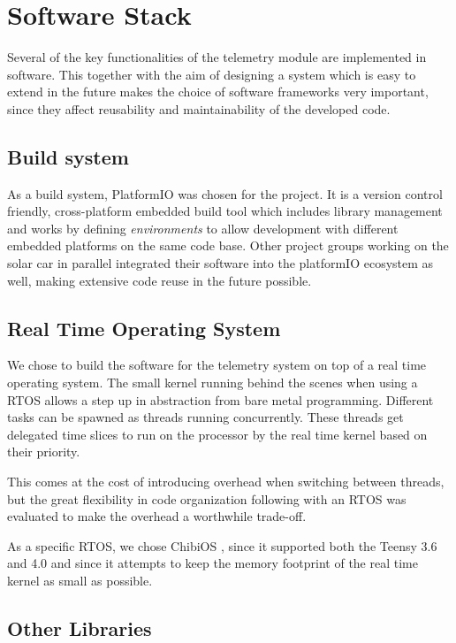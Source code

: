 \documentclass[conference]{IEEEtran}
\begin{document}
\section{Software Stack}

Several of the key functionalities of the telemetry module are implemented in software. This together with the aim of designing a system which is easy to extend in the future makes the choice of software frameworks very important, since they affect reusability and maintainability of the developed code.

\subsection{Build system}
As a build system, PlatformIO \cite{platformIO} was chosen for the project. It is a version control friendly, cross-platform embedded build tool which includes library management and works by defining \textit{environments} to allow development with different embedded platforms on the same code base. Other project groups working on the solar car in parallel integrated their software into the platformIO ecosystem as well, making extensive code reuse in the future possible.

\subsection{Real Time Operating System}
We chose to build the software for the telemetry system on top of a real time operating system. The small kernel running behind the scenes when using a RTOS allows a step up in abstraction from bare metal programming. Different tasks can be spawned as threads running concurrently. These threads get delegated time slices to run on the processor by the real time kernel based on their priority. 

This comes at the cost of introducing overhead when switching between threads, but the great flexibility in code organization following with an RTOS was evaluated to make the overhead a worthwhile trade-off.

As a specific RTOS, we chose ChibiOS \cite{chibios}, since it supported both the Teensy 3.6 and 4.0 and since it attempts to keep the memory footprint of the real time kernel as small as possible.

\subsection{Other Libraries}
\end{document}
